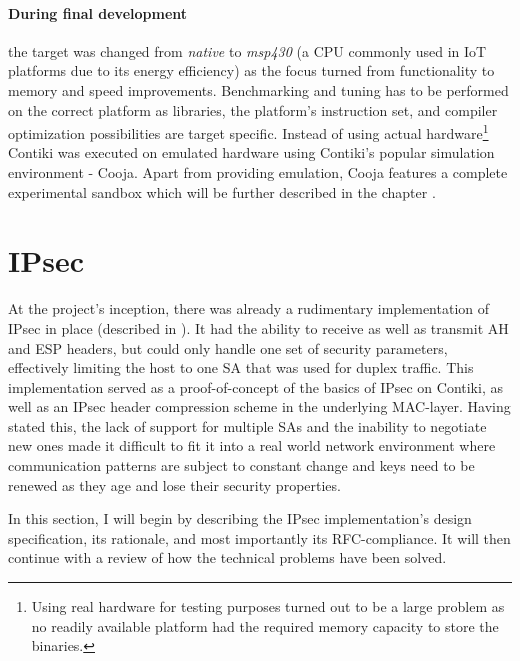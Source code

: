 \documentclass[final,a4paper,twoside,11pt,onecolumn]{report}
\begin{document}
\paragraph{During final development} \label{sec:finaldev} the target was changed from \emph{native} to \emph{msp430} (a CPU commonly used in IoT platforms due to its energy efficiency) as the focus turned from functionality to memory and speed improvements. Benchmarking and tuning has to be performed on the correct platform as libraries, the platform's instruction set, and compiler optimization possibilities are target specific. Instead of using actual hardware\footnote{Using real hardware for testing purposes turned out to be a large problem as no readily available platform had the required memory capacity to store the binaries.} Contiki was executed on emulated hardware using Contiki's popular simulation environment - Cooja\cite{osterlind06crosslevel}. Apart from providing emulation, Cooja features a complete experimental sandbox which will be further described in the chapter .



\section{IPsec}
At the project's inception, there was already a rudimentary implementation of IPsec in place (described in \cite{raza11securing}). It had the ability to receive as well as transmit AH and ESP headers, but could only handle one set of security parameters, effectively limiting the host to one SA that was used for duplex traffic. This implementation served as a proof-of-concept of the basics of IPsec on Contiki, as well as an IPsec header compression scheme in the underlying MAC-layer. Having stated this, the lack of support for multiple SAs and the inability to negotiate new ones made it difficult to fit it into a real world network environment where communication patterns are subject to constant change and keys need to be renewed as they age and lose their security properties.

In this section, I will begin by describing the IPsec implementation's design specification, its rationale, and most importantly its RFC-compliance. It will then continue with a review of how the technical problems have been solved.
\end{document}
